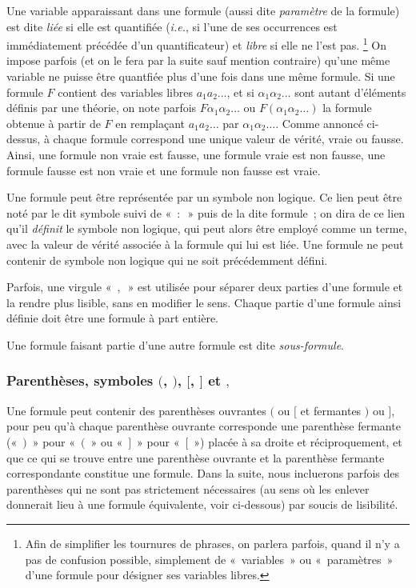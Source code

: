 Une variable apparaissant dans une formule (aussi dite \textit{paramètre} de la formule) est dite \textit{liée} si elle est quantifiée (\textit{i.e.}, si l'une de ses occurrences est immédiatement précédée d'un quantificateur) et \textit{libre} si elle ne l'est pas.%
\footnote{
    Afin de simplifier les tournures de phrases, on parlera parfois, quand il n'y a pas de confusion possible, simplement de « variables » ou « paramètres » d'une formule pour désigner ses variables libres. 
}
On impose parfois (et on le fera par la suite sauf mention contraire) qu'une même variable ne puisse être quantfiée plus d'une fois dans une même formule.
Si une formule $F$ contient des variables libres $a_1 a_2 \dots$, et si $\alpha_1 \alpha_2 \dots$ sont autant d'éléments définis par une théorie, on note parfois $F \alpha_1 \alpha_2 \dots$ ou $F (\alpha_1 \alpha_2 \dots)$ la formule obtenue à partir de $F$ en remplaçant $a_1 a_2 \dots$ par $\alpha_1 \alpha_2 \dots$.
Comme annoncé ci-dessus, à chaque formule correspond une unique valeur de vérité, vraie ou fausse. 
Ainsi, une formule non vraie est fausse, une formule vraie est non fausse, une formule fausse est non vraie et une formule non fausse est vraie.

Une formule peut être représentée par un symbole non logique. 
Ce lien peut être noté par le dit symbole suivi de « $:$ » puis de la dite formule ; on dira de ce lien qu'il \textit{définit} le symbole non logique, qui peut alors être employé comme un terme, avec la valeur de vérité associée à la formule qui lui est liée. 
Une formule ne peut contenir de symbole non logique qui ne soit précédemment défini. 

Parfois, une virgule « $,$ » est utilisée pour séparer deux parties d'une formule et la rendre plus lisible, sans en modifier le sens. 
Chaque partie d'une formule ainsi définie doit être une formule à part entière. 

Une formule faisant partie d'une autre formule est dite \textit{sous-formule}.

\subsubsection{Parenthèses, symboles $($, $)$, $[$, $]$ et $,$}

Une formule peut contenir des parenthèses ouvrantes $($ ou $[$ et fermantes $)$ ou $]$, pour peu qu'à chaque parenthèse ouvrante corresponde une parenthèse fermante (« $)$ » pour « $($ » ou « $]$ » pour « $[$ ») placée à sa droite et réciproquement, et que ce qui se trouve entre une parenthèse ouvrante et la parenthèse fermante correspondante constitue une formule. 
Dans la suite, nous incluerons parfois des parenthèses qui ne sont pas strictement nécessaires (au sens où les enlever donnerait lieu à une formule équivalente, voir ci-dessous) par soucis de lisibilité.

